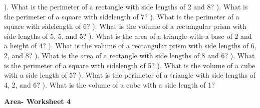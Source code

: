 \documentclass{article}%
\begin{document}
). What is the perimeter of a rectangle with side lengths of 2 and 8?%
\newline%
\newline%
). What is the perimeter of a square with sidelength of 7?%
\newline%
\newline%
). What is the perimeter of a square with sidelength of 6?%
\newline%
\newline%
). What is the volume of a rectangular prism with side lengths of 5, 5, and 5?%
\newline%
\newline%
). What is the area of a triangle with a base of 2 and a height of 4?%
\newline%
\newline%
). What is the volume of a rectangular prism with side lengths of 6, 2, and 8?%
\newline%
\newline%
). What is the area of a rectangle with side lengths of 8 and 6?%
\newline%
\newline%
). What is the perimeter of a square with sidelength of 5?%
\newline%
\newline%
). What is the volume of a cube with a side length of 5?%
\newline%
\newline%
). What is the perimeter of a triangle with side lengths of 4, 2, and 6?%
\newline%
\newline%
). What is the volume of a cube with a side length of 1?%
\newline%
\newline%
\newline%
\pagebreak%
\large%
\begin{center}%
\textbf{Area- Worksheet 4}%
\newline%
\end{center} \normalsize%
\end{document}
